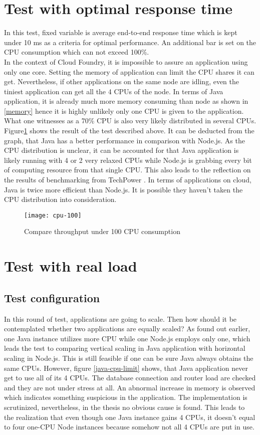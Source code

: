 \section{Test with optimal response time}
In this test, fixed variable is average end-to-end response time which is kept under 10 ms  as a criteria for optimal performance. An additional bar is set on the CPU consumption which can not exceed 100\%. \\
In the context of Cloud Foundry, it is impossible to assure an application using only one core. Setting the memory of application can limit the CPU shares it can get. Nevertheless, if other applications on the same node are idling, even the tiniest application can get all the 4 CPUs of the node. In terms of Java application, it is already much more memory consuming than node as shown in \ref{memory} hence it is highly unlikely only one CPU is given to the application. What one witnesses as a 70\% CPU is also very likely distributed in several CPUs.\\
Figure\ref{cpu-100} shows the result of the test described above. It can be deducted from the graph, that Java has a better performance in comparison with Node.js. As the CPU distribution is unclear,  it can be accounted for that Java application is likely running with 4 or 2 very relaxed CPUs while Node.js is grabbing every bit of computing resource from that single CPU. This also leads to the reflection on the results of benchmarking from TechPower \citep{benchmark}. In terms of applications on cloud, Java is twice more efficient than Node.js. It is possible they haven't taken the CPU distribution into consideration. 

\begin{figure}[h]
	\centering
	\texttt{[image: cpu-100]}
	\caption{Compare throughput under 100 CPU consumption}
	\label{cpu-100}
\end{figure}


\section{Test with real load}
\subsection{Test configuration}
 In this round of test, applications are going to scale. Then how should it be contemplated whether two applications are equally scaled? As found out earlier, one Java instance utilizes more CPU while one Node.js employs only one, which leads the test to comparing vertical scaling in Java application with horizontal scaling in Node.js. This is still feasible if one can be sure Java always obtains the same CPUs. However, figure \ref{java-cpu-limit} shows, that Java application never get to use all of its 4 CPUs. The database connection and router load are checked and they are not under stress at all.  An abnormal increase in memory is observed which indicates something suspicious in the application. The implementation is scrutinized, nevertheless, in the thesis no obvious cause is found. This leads to the realization that even though one Java instance gains 4 CPUs, it doesn't equal to four one-CPU Node instances because somehow not all 4 CPUs are put in use. 
 
